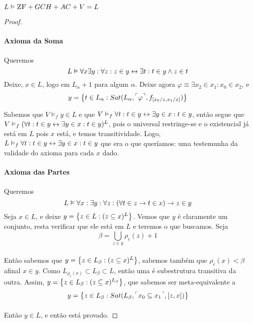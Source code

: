 \begin{theorem}{$L\vDash\text{\sc ZF}+GCH+AC+V=L$}
\begin{proof}
                \paragraph{Axioma da Soma}\nl
                    Queremos 
                    $$L\vDash\forall x\exists y:\forall z: z\in y \leftrightarrow \exists t: t\in y\land z\in t$$
                    Deixe, $x\in L$, logo em $L_\alpha+1$ para algum $\alpha$. Deixe agora $\varphi\equiv\exists x_2\in x_1:x_0\in x_2$, e 
                    $$ y = \SET{t\in L_\alpha : Sat(L_\alpha, \FMLA{\varphi}, f_{[x_0\slash z, x_1\slash x]})}$$

                    Sabemos que $V\vDash_f y\in L$ e que $V\vDash_f\forall t: t\in y\leftrightarrow\exists y\in x: t\in y$, então segue que 
                    $V\vDash_f(\forall t: t\in y\leftrightarrow\exists y\in x: t\in y)^L$, pois o universal restringe-se e o existencial 
                    já está em $L$ pois $x$ está, e temos transitividade. Logo, $L\vDash_f\forall t: t\in y\leftrightarrow\exists y\in x: t\in y$
                    que era o que queríamos: uma testemunha da validade do axioma para cada $x$ dado.
                \paragraph{Axioma das Partes}\nl
                    Queremos
                    $$L\vDash\forall x:\exists y:\forall z:(\forall t\in z\rightarrow t\in x)\rightarrow z\in y$$
                    Seja $x\in L$, e deixe $y = \SET{z\in L: (z\subseteq x)^L}$. Vemos que $y$ é 
                    claramente um conjunto, resta verificar que ele está em $L$ e teremos o que 
                    buscamos. Seja  
                    $$\beta = \bigcup_{z\in y}\rho_c(z)+1$$
                \paragraph{}
                    Então sabemos que $y = \SET{z\in L_\beta : (z\subseteq x)^L}$, sabemos também que 
                    $\rho_c(x)<\beta$ afinal $x\in y$. Como $L_{\rho_c (x)}\subset L_\beta\subset L$, 
                    então uma é subestrutura transitiva da outra. Assim, $y = \SET{z\in L_\beta : 
                    (z\subseteq x)^{L_\beta}}$, que sabemos ser meta-equivalente a
                    $$y = \SET{z\in L_\beta : Sat(L_\beta, \FMLA{x_0\subseteq x_1}, [z, x])}$$
                \paragraph{}
                    Então $y\in L$, e então está provado.

\end{proof}
\end{theorem}
